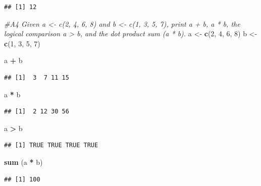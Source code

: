 \documentclass[
]{article}
\newenvironment{Shaded}{\begin{snugshade}}{\end{snugshade}}
\newcommand{\CommentTok}[1]{\textcolor[rgb]{0.56,0.35,0.01}{\textit{#1}}}
\newcommand{\DecValTok}[1]{\textcolor[rgb]{0.00,0.00,0.81}{#1}}
\newcommand{\FunctionTok}[1]{\textcolor[rgb]{0.13,0.29,0.53}{\textbf{#1}}}
\newcommand{\NormalTok}[1]{#1}
\newcommand{\OtherTok}[1]{\textcolor[rgb]{0.56,0.35,0.01}{#1}}
\newcommand{\SpecialCharTok}[1]{\textcolor[rgb]{0.81,0.36,0.00}{\textbf{#1}}}
\begin{document}
\begin{verbatim}
## [1] 12
\end{verbatim}

\begin{Shaded}
\begin{Highlighting}[]
\CommentTok{\#A4 Given a \textless{}{-} c(2, 4, 6, 8) and b \textless{}{-} c(1, 3, 5, 7), print a + b, a * b, the logical comparison a \textgreater{} b, and the dot product sum (a * b).}
\NormalTok{a }\OtherTok{\textless{}{-}} \FunctionTok{c}\NormalTok{(}\DecValTok{2}\NormalTok{, }\DecValTok{4}\NormalTok{, }\DecValTok{6}\NormalTok{, }\DecValTok{8}\NormalTok{)}
\NormalTok{b }\OtherTok{\textless{}{-}} \FunctionTok{c}\NormalTok{(}\DecValTok{1}\NormalTok{, }\DecValTok{3}\NormalTok{, }\DecValTok{5}\NormalTok{, }\DecValTok{7}\NormalTok{)}

\NormalTok{a }\SpecialCharTok{+}\NormalTok{ b}
\end{Highlighting}
\end{Shaded}

\begin{verbatim}
## [1]  3  7 11 15
\end{verbatim}

\begin{Shaded}
\begin{Highlighting}[]
\NormalTok{a }\SpecialCharTok{*}\NormalTok{ b}
\end{Highlighting}
\end{Shaded}

\begin{verbatim}
## [1]  2 12 30 56
\end{verbatim}

\begin{Shaded}
\begin{Highlighting}[]
\NormalTok{a }\SpecialCharTok{\textgreater{}}\NormalTok{ b}
\end{Highlighting}
\end{Shaded}

\begin{verbatim}
## [1] TRUE TRUE TRUE TRUE
\end{verbatim}

\begin{Shaded}
\begin{Highlighting}[]
\FunctionTok{sum}\NormalTok{ (a }\SpecialCharTok{*}\NormalTok{ b)}
\end{Highlighting}
\end{Shaded}

\begin{verbatim}
## [1] 100
\end{verbatim}
\end{document}
